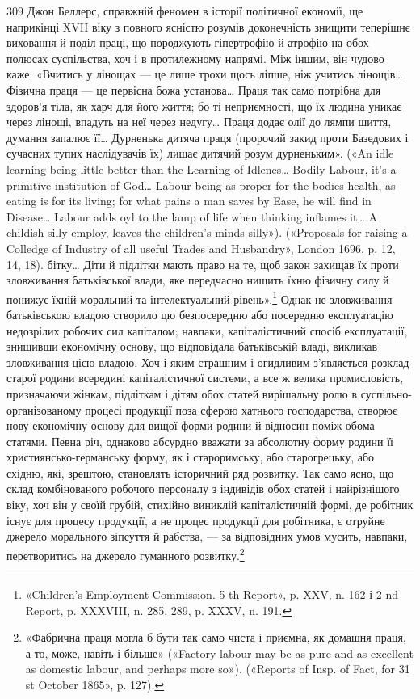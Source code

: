 309    Джон Беллерс, справжній феномен в історії політичної економії,
ще наприкінці XVII віку з повного ясністю розумів доконечність знищити
теперішнє виховання й поділ праці, що породжують гіпертрофію й атрофію
на обох полюсах суспільства, хоч і в протилежному напрямі. Між
іншим, він чудово каже: «Вчитись у лінощах — це лише трохи щось ліпше,
ніж учитись лінощів\dots{} Фізична праця — це первісна божа установа\dots{}
Праця так само потрібна для здоров’я тіла, як харч для його життя;
бо ті неприємності, що їх людина уникає через лінощі, впадуть на неї
через недугу\dots{} Праця додає олії до лямпи шиття, думання запалює її\dots{}
Дурненька дитяча праця (пророчий закид проти Базедових і сучасних
тупих наслідувачів їх) лишає дитячий розум дурненьким». («An idle
learning being little better than the Learning of Idlenes\dots{} Bodily Labour,
it’s a primitive institution of God\dots{} Labour being as proper for the
bodies health, as eating is for its living; for what pains a man saves by
Ease, he will find in Disease\dots{} Labour adds oyl to the lamp of life when
thinking inflames it\dots{} A childish silly employ, leaves the children’s minds
silly»). («Proposals for raising a Colledge of Industry of all useful Trades
and Husbandry», London 1696, p. 12, 14, 18).
бітку\dots{} Діти й підлітки мають право на те, щоб закон захищав їх
проти зловживання батьківської влади, яке передчасно нищить
їхню фізичну силу й понижує їхній моральний та інтелектуальний
рівень».\footnote{
«Children’s Employment Commission. 5 th Report», p. XXV,
n. 162 і 2 nd Report, p. XXXVIII, n. 285, 289, p. XXXV, n. 191.
} Однак не зловживання батьківською владою
створило цю безпосередню або посередню експлуатацію недозрілих
робочих сил капіталом; навпаки, капіталістичний спосіб
експлуатації, знищивши економічну основу, що відповідала батьківській
владі, викликав зловживання цією владою. Хоч і яким
страшним і огидливим з’являється розклад старої родини всередині
капіталістичної системи, а все ж велика промисловість,
призначаючи жінкам, підліткам і дітям обох статей вирішальну
ролю в суспільно-організованому процесі продукції поза сферою
хатнього господарства, створює нову економічну основу для
вищої форми родини й відносин поміж обома статями. Певна
річ, однаково абсурдно вважати за абсолютну форму родини її
християнсько-германську форму, як і староримську, або старогрецьку,
або східню, які, зрештою, становлять історичний ряд
розвитку. Так само ясно, що склад комбінованого робочого персоналу
з індивідів обох статей і найрізнішого віку, хоч він у своїй
грубій, стихійно виниклій капіталістичній формі, де робітник
існує для процесу продукції, а не процес продукції для робітника,
є отруйне джерело морального зіпсуття й рабства, — за відповідних
умов мусить, навпаки, перетворитись на джерело гуманного
розвитку.\footnote{
«Фабрична праця могла б бути так само чиста і приємна, як домашня
праця, а то, може, навіть і більше» («Factory labour may be as
pure and as excellent as domestic labour, and perhaps more so»). («Reports
of Insp. of Fact, for 31 st October 1865», p. 127).
}

